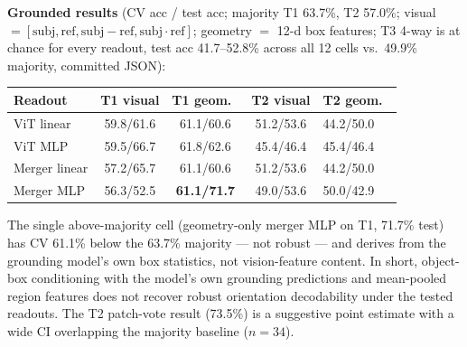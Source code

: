 \textbf{Grounded results} (CV acc / test acc; majority T1 63.7\%,
T2 57.0\%; visual $=[\text{subj},\text{ref},\text{subj}-\text{ref},
\text{subj}\cdot\text{ref}]$; geometry $=$ 12-d box features; T3 4-way is at
chance for every readout, test acc 41.7--52.8\% across all 12 cells vs.\
49.9\% majority, committed JSON):
\begin{center}
\footnotesize
\begin{tabular}{lcccl}
\toprule
Readout & T1 visual & T1 geom.\ & T2 visual & T2 geom.\ \\
\midrule
ViT linear & 59.8/61.6 & 61.1/60.6 & 51.2/53.6 & 44.2/50.0 \\
ViT MLP & 59.5/66.7 & 61.8/62.6 & 45.4/46.4 & 45.4/46.4 \\
Merger linear & 57.2/65.7 & 61.1/60.6 & 51.2/53.6 & 44.2/50.0 \\
Merger MLP & 56.3/52.5 & \textbf{61.1/71.7} & 49.0/53.6 & 50.0/42.9 \\
\bottomrule
\end{tabular}
\end{center}
The single above-majority cell (geometry-only merger MLP on T1, 71.7\% test)
has CV 61.1\% below the 63.7\% majority --- not robust --- and derives from the
grounding model's own box statistics, not vision-feature content. In short,
object-box conditioning with the model's own grounding predictions and
mean-pooled region features does not recover robust orientation decodability
under the tested readouts. The T2 patch-vote result (73.5\%) is a suggestive
point estimate with a wide CI overlapping the majority baseline ($n{=}34$).


